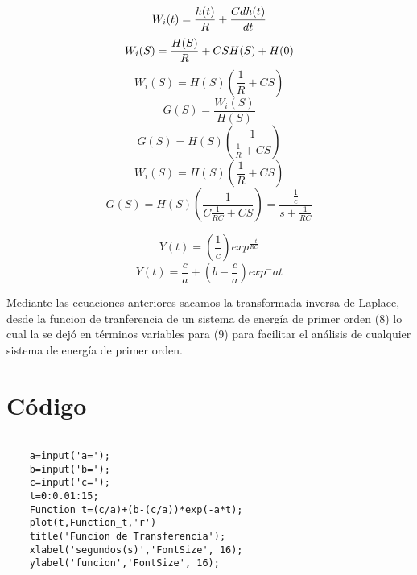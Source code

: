 \documentclass[letterpaper,10pt]{article}
\begin{document}
    \vspace*{0.3in}
    \begin{equation}
    W_i(t) = \frac {h(t)}{R} + \frac {Cdh(t)}{dt}\\
    \end{equation}
        \begin{equation}    
    W_i(S) = \frac {H(S)}{R} + CSH(S)+H(0)\\
    \end{equation}
        \begin{equation}
    W_i(S) = H(S)(\frac{1}{R} + CS)
    \end{equation}
    \begin{equation}    
    G(S) = \frac{W_i(S)}{H(S)}
    \end{equation}
    \begin{equation}
    G(S) = H(S)(\frac{1}{\frac{1}{R} + CS})
    \end{equation}
	\begin{equation}
	W_i(S) = H(S)(\frac{1}{R} + CS)
	\end{equation}
	 \begin{equation}
	G(S) = H(S)(\frac{1}{C\frac{1}{RC} + CS}) = \frac{\frac{1}{c}}{s+\frac{1}{RC}}
	\end{equation}
    
\pagebreak
 \begin{equation}
Y(t) = (\frac{1}{c})exp^\frac{-t}{RC}
\end{equation}
 \begin{equation}
Y(t) = \frac{c}{a}+(b-\frac{c}{a}){exp^-at}
\end{equation}

\vspace*{0.3in}
\textbf{}
 Mediante las ecuaciones anteriores sacamos la transformada inversa de Laplace,
 desde la funcion de tranferencia de un sistema de energía de primer orden (8) lo cual la se dejó en términos variables para (9) para facilitar el análisis de cualquier sistema de energía de primer orden. 
 
 \pagebreak
 
 \section{Código}
\begin{center}
	\begin{lstlisting}[frame=single]
	
	a=input('a=');
	b=input('b=');
	c=input('c=');
	t=0:0.01:15;
	Function_t=(c/a)+(b-(c/a))*exp(-a*t);
	plot(t,Function_t,'r')
	title('Funcion de Transferencia');
	xlabel('segundos(s)','FontSize', 16);
	ylabel('funcion','FontSize', 16); 
	\end{lstlisting}
\end{center}
\FloatBarrier
\end{document}

